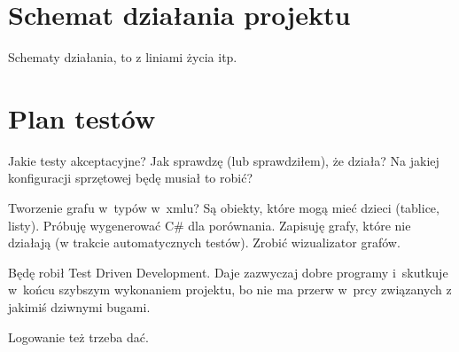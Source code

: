 %
%
%
%
%
%
%
%
%
%

\section{Schemat działania projektu}
Schematy działania, to z liniami życia itp.

\section{Plan testów}
Jakie testy akceptacyjne? Jak sprawdzę (lub sprawdziłem), że działa? Na jakiej konfiguracji sprzętowej będę musiał to robić?

Tworzenie grafu w~typów w~xmlu? Są obiekty, które mogą mieć dzieci (tablice, listy). Próbuję wygenerować C\# dla porównania. Zapisuję grafy, które nie działają (w trakcie automatycznych testów). Zrobić wizualizator grafów.

Będę robił Test Driven Development. Daje zazwyczaj dobre programy i~skutkuje w~końcu szybszym wykonaniem projektu, bo nie ma przerw w~prcy związanych z jakimiś dziwnymi bugami.

Logowanie też trzeba dać.

